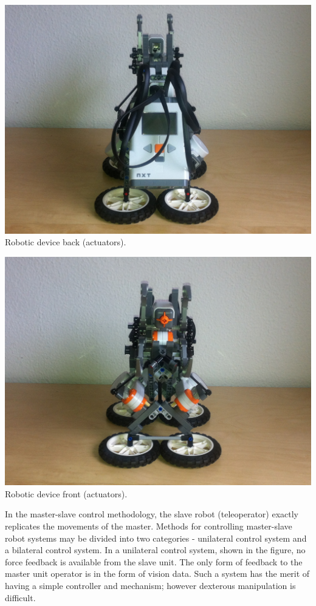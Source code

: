 \documentclass[a4paper,11pt]{article}
\begin{document}
\begin{multicols}{2}
			\begin{center}
				\includegraphics[scale=0.2]{img/robot2.png}\\
				Robotic device back (actuators).
			\end{center}

			\begin{center}
				\includegraphics[scale=0.2]{img/robot3.png}\\
				Robotic device front (actuators).
			\end{center}


			In the master-slave control methodology, the slave robot (teleoperator) exactly replicates the movements of the master. Methods for controlling master-slave robot systems may be divided into two categories - unilateral control system and a bilateral control system. In a unilateral control system, shown in the figure, no force feedback is available from the slave unit. The only form of feedback to the master unit operator is in the form of vision data. Such a system has the merit of having a simple controller and mechanism; however dexterous manipulation is difficult.


\end{multicols}
\end{document}

